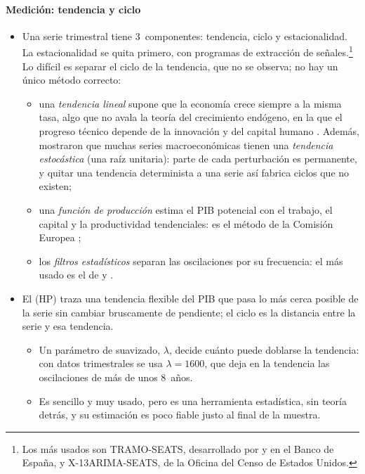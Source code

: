 \documentclass[11pt]{article}
\begin{document}
\paragraph{Medición: tendencia y ciclo}

\begin{itemize}
\item Una serie trimestral tiene 3~componentes: tendencia, ciclo y estacionalidad. La estacionalidad se quita primero, con programas de extracción de señales.\footnote{Los más usados son TRAMO-SEATS, desarrollado por  y  en el Banco de España, y X-13ARIMA-SEATS, de la Oficina del Censo de Estados Unidos.} Lo difícil es separar el ciclo de la tendencia, que no se observa; no hay un único método correcto:
  \begin{itemize}
  \item una \emph{tendencia lineal} supone que la economía crece siempre a la misma tasa, algo que no avala la teoría del crecimiento endógeno, en la que el progreso técnico depende de la innovación y del capital humano . Además, \textcite{NelsonPlosser1982Trends} mostraron que muchas series macroeconómicas tienen una \emph{tendencia estocástica} (una raíz unitaria): parte de cada perturbación es permanente, y quitar una tendencia determinista a una serie así fabrica ciclos que no existen;
  \item una \emph{función de producción} estima el PIB potencial con el trabajo, el capital y la productividad tendenciales: es el método de la Comisión Europea\nocite{Havik2014Potencial}  ;
  \item los \emph{filtros estadísticos} separan las oscilaciones por su frecuencia: el más usado es el de  y .
  \end{itemize}
\item El  (HP) traza una tendencia flexible del PIB que pasa lo más cerca posible de la serie sin cambiar bruscamente de pendiente; el ciclo es la distancia entre la serie y esa tendencia.
  \begin{itemize}
  \item Un parámetro de suavizado, $\lambda$, decide cuánto puede doblarse la tendencia: con datos trimestrales se usa $\lambda=1600$, que deja en la tendencia las oscilaciones de más de unos 8~años.
  \item Es sencillo y muy usado, pero es una herramienta estadística, sin teoría detrás, y su estimación es poco fiable justo al final de la muestra.
  \end{itemize}
\end{itemize}
\end{document}

